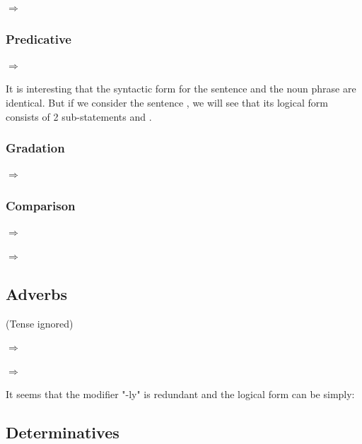  $\Longrightarrow$ 

\subsubsection{Predicative}

 $\Longrightarrow$ 

It is interesting that the syntactic form for the sentence  and the noun phrase  are identical.  But if we consider the sentence , we will see that its logical form consists of 2 sub-statements  and .

\subsubsection{Gradation}

 $\Longrightarrow$ 

\subsubsection{Comparison}

 $\Longrightarrow$ 

 $\Longrightarrow$ 

\subsection{Adverbs}

(Tense ignored)

 $\Longrightarrow$ 

 $\Longrightarrow$ 

It seems that the modifier "-ly" is redundant and the logical form can be simply:\\
\tab\tab\tab\tab {}

\subsection{Determinatives}

